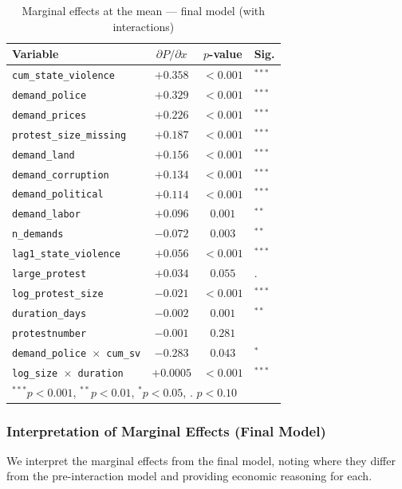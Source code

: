 \documentclass[12pt,a4paper]{article}
\begin{document}
\begin{table}[H]
\centering
\caption{Marginal effects at the mean --- final model (with interactions)}
\label{tab:mfx_after}
\begin{tabular}{lccl}
\toprule
Variable & $\partial P / \partial x$ & $p$-value & Sig. \\
\midrule
\texttt{cum\_state\_violence} & $+0.358$ & $< 0.001$ & $^{***}$ \\
\texttt{demand\_police} & $+0.329$ & $< 0.001$ & $^{***}$ \\
\texttt{demand\_prices} & $+0.226$ & $< 0.001$ & $^{***}$ \\
\texttt{protest\_size\_missing} & $+0.187$ & $< 0.001$ & $^{***}$ \\
\texttt{demand\_land} & $+0.156$ & $< 0.001$ & $^{***}$ \\
\texttt{demand\_corruption} & $+0.134$ & $< 0.001$ & $^{***}$ \\
\texttt{demand\_political} & $+0.114$ & $< 0.001$ & $^{***}$ \\
\texttt{demand\_labor} & $+0.096$ & $0.001$ & $^{**}$ \\
\texttt{n\_demands} & $-0.072$ & $0.003$ & $^{**}$ \\
\texttt{lag1\_state\_violence} & $+0.056$ & $< 0.001$ & $^{***}$ \\
\texttt{large\_protest} & $+0.034$ & $0.055$ & . \\
\texttt{log\_protest\_size} & $-0.021$ & $< 0.001$ & $^{***}$ \\
\texttt{duration\_days} & $-0.002$ & $0.001$ & $^{**}$ \\
\texttt{protestnumber} & $-0.001$ & $0.281$ & \\
\texttt{demand\_police $\times$ cum\_sv} & $-0.283$ & $0.043$ & $^{*}$ \\
\texttt{log\_size $\times$ duration} & $+0.0005$ & $< 0.001$ & $^{***}$ \\
\midrule
\multicolumn{4}{l}{\footnotesize $^{***}p<0.001$, $^{**}p<0.01$, $^{*}p<0.05$, . $p<0.10$} \\
\bottomrule
\end{tabular}
\end{table}

\subsubsection{Interpretation of Marginal Effects (Final Model)}

We interpret the marginal effects from the final model, noting where they differ from the pre-interaction model and providing economic reasoning for each.
\end{document}
